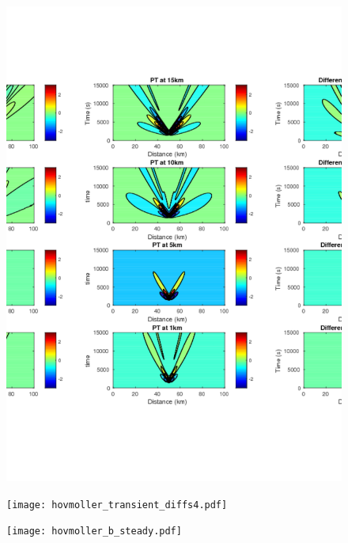 \documentclass[a4paper,10pt]{article}
\begin{document}
\begin{figure}[h!]
  \caption{}
  \centering
    \includegraphics[width=1\textwidth]{hovmoller_transient_diffs_w1.pdf}
  \label{trop_values_transient_diff_w1}
\end{figure}

\begin{figure}[h!]
  \caption{}
  \centering
    \texttt{[image: hovmoller\_transient\_diffs4.pdf]}
  \label{trop_values_transient_diff_w1}
\end{figure}


\begin{figure}[h!]
  \caption{}
  \centering
    \texttt{[image: hovmoller\_b\_steady.pdf]}
  \label{hovmoller_b_steady}
\end{figure}




\end{document}
